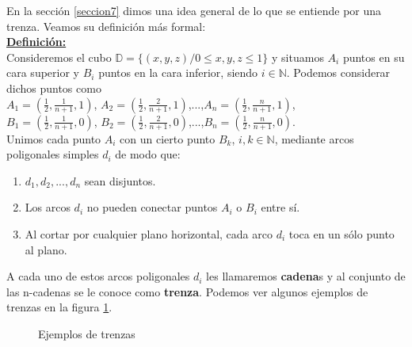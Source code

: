 En la sección \ref{seccion7} dimos una idea general de lo que se entiende por una trenza. Veamos su definición más formal:\\

\underline{\textbf{Definición:}}\\
Consideremos el cubo $\mathds{D} = \{(x,y,z) / 0 \leq x,y,z \leq 1\}$ y situamos $A_{i}$ puntos en su cara superior y $B_{i}$ puntos en la cara inferior, siendo $i \in \mathds{N}$. Podemos considerar dichos puntos como \\
$A_{1}=(\frac{1}{2},\frac{1}{n+1},1)$, $A_{2}=(\frac{1}{2},\frac{2}{n+1},1)$,...,$A_{n}=(\frac{1}{2},\frac{n}{n+1},1)$, \\ $B_{1}=(\frac{1}{2},\frac{1}{n+1},0)$, $B_{2}=(\frac{1}{2},\frac{2}{n+1},0)$,...,$B_{n}=(\frac{1}{2},\frac{n}{n+1},0)$.\\
  Unimos cada punto $A_{i}$ con un cierto punto $B_{k}$, $i, k \in \mathds{N}$, mediante arcos poligonales simples $d_{i}$ de modo que:
\begin{enumerate}
	\item $ d_{1}, d_{2},...,d_{n} $ sean disjuntos.
	\item Los arcos $ d_{i} $ no pueden conectar puntos $A_{i}$ o $B_{i}$ entre sí.
	\item Al cortar por cualquier plano horizontal, cada arco $ d_{i} $ toca en un sólo punto al plano. 
\end{enumerate}
A cada uno de estos arcos poligonales $ d_{i} $ les llamaremos \textbf{cadena}s y al conjunto de las n-cadenas se le conoce como \textbf{trenza}. Podemos ver algunos ejemplos de trenzas en la figura \ref{tren1}.
\begin{figure}[h!]
	\centering
	\space
	\caption{Ejemplos de trenzas}
	\label{tren1} 
\end{figure}  

